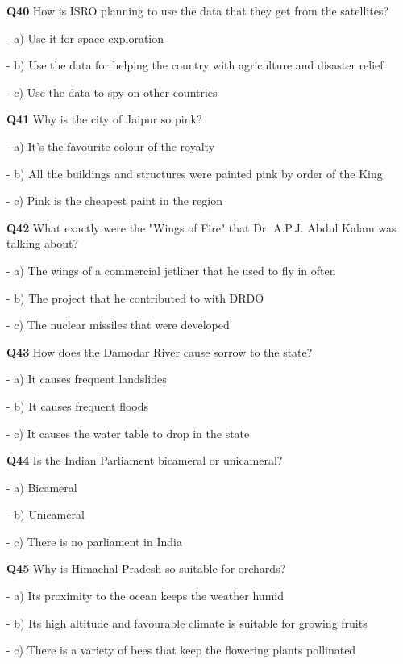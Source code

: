 \textbf{Q40} How is ISRO planning to use the data that they get from the satellites?\par
\quad - a) Use it for space exploration\par
\quad - b) Use the data for helping the country with agriculture and disaster relief\par
\quad - c) Use the data to spy on other countries\par

\textbf{Q41} Why is the city of Jaipur so pink?\par
\quad - a) It's the favourite colour of the royalty\par
\quad - b) All the buildings and structures were painted pink by order of the King\par
\quad - c) Pink is the cheapest paint in the region\par

\textbf{Q42} What exactly were the "Wings of Fire" that Dr. A.P.J. Abdul Kalam was talking about?\par
\quad - a) The wings of a commercial jetliner that he used to fly in often\par
\quad - b) The project that he contributed to with DRDO\par
\quad - c) The nuclear missiles that were developed\par

\textbf{Q43} How does the Damodar River cause sorrow to the state?\par
\quad - a) It causes frequent landslides\par
\quad - b) It causes frequent floods\par
\quad - c) It causes the water table to drop in the state\par

\textbf{Q44} Is the Indian Parliament bicameral or unicameral?\par
\quad - a) Bicameral\par
\quad - b) Unicameral\par
\quad - c) There is no parliament in India\par

\textbf{Q45} Why is Himachal Pradesh so suitable for orchards?\par
\quad - a) Its proximity to the ocean keeps the weather humid\par
\quad - b) Its high altitude and favourable climate is suitable for growing fruits\par
\quad - c) There is a variety of bees that keep the flowering plants pollinated\par

